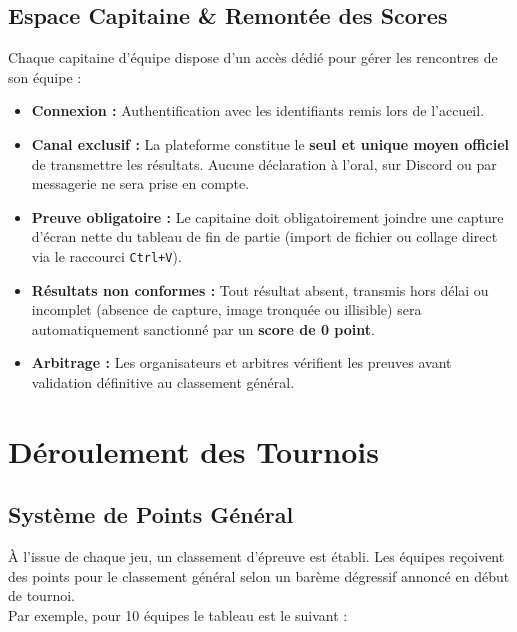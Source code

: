 \documentclass[11pt,a4paper]{article}
\begin{document}
    \subsection{Espace Capitaine \& Remontée des Scores}
    Chaque capitaine d'équipe dispose d'un accès dédié pour gérer les rencontres de son équipe :
    \begin{itemize}
        \item \textbf{Connexion :} Authentification avec les identifiants remis lors de l'accueil.
        \item \textbf{Canal exclusif :} La plateforme constitue le \textbf{seul et unique moyen officiel} de transmettre les résultats.
        Aucune déclaration à l'oral, sur Discord ou par messagerie ne sera prise en compte.
        \item \textbf{Preuve obligatoire :} Le capitaine doit obligatoirement joindre une capture d'écran nette du tableau de fin de partie (import de fichier ou collage direct via le raccourci \texttt{Ctrl+V}).
        \item \textbf{Résultats non conformes :} Tout résultat absent, transmis hors délai ou incomplet (absence de capture, image tronquée ou illisible) sera automatiquement sanctionné par un \textbf{score de 0 point}.
        \item \textbf{Arbitrage :} Les organisateurs et arbitres vérifient les preuves avant validation définitive au classement général.
    \end{itemize}


    \section{Déroulement des Tournois}

    \subsection{Système de Points Général}
    À l'issue de chaque jeu, un classement d'épreuve est établi.
    Les équipes reçoivent des points pour le classement général selon un barème dégressif annoncé en début de tournoi.\\
    Par exemple, pour 10 équipes le tableau est le suivant :
\end{document}
